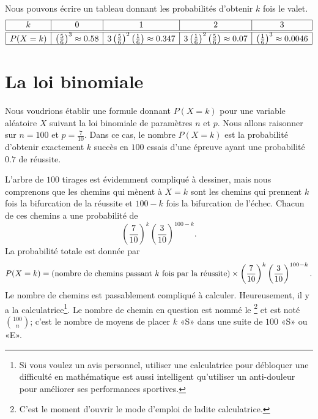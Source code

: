 \begin{example}
    Nous pouvons écrire un tableau donnant les probabilités d'obtenir \( k\) fois le valet.
    \begin{equation}
        \begin{array}[]{|c|c|c|c|c|}
            \hline
            k&0&1&2&3\\
            \hline\hline
            P(X=k)&\left( \frac{ 5 }{ 6 } \right)^3\approx 0.58& 3\left( \frac{ 5 }{ 6 } \right)^2\left( \frac{1}{ 6 } \right)\approx 0.347 &3\left( \frac{1}{ 6 } \right)^2\left( \frac{ 5 }{ 6 } \right)\approx 0.07&\left( \frac{1}{ 6 } \right)^3\approx0.0046\\
            \hline
        \end{array}
    \end{equation}

\end{example}

\section{La loi binomiale}

Nous voudrions établir une formule donnant \( P(X=k)\) pour une variable aléatoire \( X\) suivant la loi binomiale de paramètres \( n\) et \( p\). Nous allons raisonner sur \( n=100\) et \( p=\frac{ 7 }{ 10 }\). Dans ce cas, le nombre \( P(X=k)\) est la probabilité d'obtenir exactement \( k\) succès en \( 100\) essais d'une épreuve ayant une probabilité \( 0.7\) de réussite.

L'arbre de \( 100\) tirages est évidemment compliqué à dessiner, mais nous comprenons que les chemins qui mènent à \( X=k\) sont les chemins qui prennent \( k\) fois la bifurcation de la réussite et \( 100-k\) fois la bifurcation de l'échec. Chacun de ces chemins a une probabilité de
\begin{equation}
    \left( \frac{ 7 }{ 10 } \right)^{k}\left( \frac{ 3 }{ 10 } \right)^{100-k}.
\end{equation}
La probabilité totale est donnée par
\begin{equation}
    P(X=k)=(\text{nombre de chemins passant \( k\) fois par la réussite})\times \left( \frac{ 7 }{ 10 } \right)^k\left( \frac{ 3 }{ 10 } \right)^{100-k}.
\end{equation}
Le nombre de chemins est passablement compliqué à calculer. Heureusement, il y a la calculatrice\footnote{Si vous voulez un avis personnel, utiliser une calculatrice pour débloquer une difficulté en mathématique est aussi intelligent qu'utiliser un anti-douleur pour améliorer ses performances sportives.}. Le nombre de chemin en question est nommé le \footnote{C'est le moment d'ouvrir le mode d'emploi de ladite calculatrice.} et est noté \( {100\choose n}\); c'est le nombre de moyens de placer \( k\) «S» dans une suite de \( 100\) «S» ou «E».

